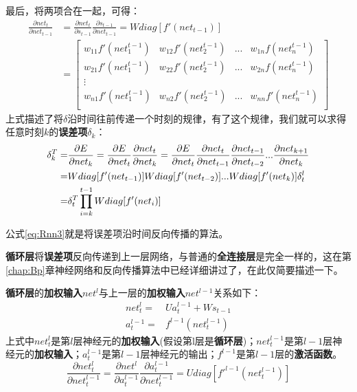 最后，将两项合在一起，可得：
\begin{align*}
	\frac{\partial{{net}_t}}{\partial{{net}_{t-1}}} & =\frac{\partial{{net}_t}}{\partial{{s}_{t-1}}}\frac{\partial{{s}_{t-1}}}{\partial{{net}_{t-1}}}=Wdiag[f'({net}_{t-1})] \\
	                                                & =\begin{bmatrix}
		w_{11}f'(net_1^{t-1}) & w_{12}f'(net_2^{t-1})  & ... & w_{1n}f(net_n^{t-1})   \\
		w_{21}f'(net_1^{t-1}) & w_{22} f'(net_2^{t-1}) & ... & w_{2n}f(net_n^{t-1})   \\
		\vdots                                                                        \\
		w_{n1}f'(net_1^{t-1}) & w_{n2} f'(net_2^{t-1}) & ... & w_{nn} f'(net_n^{t-1}) \\
	\end{bmatrix}
\end{align*}
上式描述了将\(\delta\)沿时间往前传递一个时刻的规律，有了这个规律，我们就可以求得任意时刻$k$的\textbf{误差项}\(\delta_k\)：
\begin{align}
	\delta_k^T= & \frac{\partial{E}}{\partial{{net}_k}}=\frac{\partial{E}}{\partial{{net}_t}}\frac{\partial{{net}_t}}{\partial{{net}_k}}=\frac{\partial{E}}{\partial{{net}_t}}\frac{\partial{{net}_t}}{\partial{{net}_{t-1}}}\frac{\partial{{net}_{t-1}}}{\partial{{net}_{t-2}}}...\frac{\partial{{net}_{k+1}}}{\partial{{net}_{k}}}\notag \\
	=           & Wdiag[f'({net}_{t-1})]Wdiag[f'({net}_{t-2})]...Wdiag[f'({net}_{k})]\delta_t^l\notag                                                                                                                                                                                                                                      \\
	=           & \delta_t^T\prod_{i=k}^{t-1}Wdiag[f'({net}_{i})]\label{eq:Rnn3}
\end{align}


公式\ref{eq:Rnn3}就是将误差项沿时间反向传播的算法。

\textbf{循环层}将\textbf{误差项}反向传递到上一层网络，与普通的\textbf{全连接层}是完全一样的，这在第\ref{chap:Bp}章神经网络和反向传播算法中已经详细讲过了，在此仅简要描述一下。

\textbf{循环层}的\textbf{加权输入}\({net}^l\)与上一层的\textbf{加权输入}\({net}^{l-1}\)关系如下：
\begin{align*}
	{net}_t^l=   & U{a}_t^{l-1}+W{s}_{t-1} \\
	{a}_t^{l-1}= & f^{l-1}({net}_t^{l-1})
\end{align*}
上式中\({net}_t^l\)是第$l$层神经元的\textbf{加权输入}(假设第l层是\textbf{循环层})；\({net}_t^{l-1}\)是第$l-1$层神经元的\textbf{加权输入}；\({a}_t^{l-1}\)是第$l-1$层神经元的输出；\(f^{l-1}\)是第$l-1$层的\textbf{激活函数}。
\[
	\frac{\partial{{net}_t^l}}{\partial{{net}_t^{l-1}}}=\frac{\partial{{net}^l}}{\partial{{a}_t^{l-1}}}\frac{\partial{{a}_t^{l-1}}}{\partial{{net}_t^{l-1}}}=Udiag[f'^{l-1}({net}_t^{l-1})]
\]


